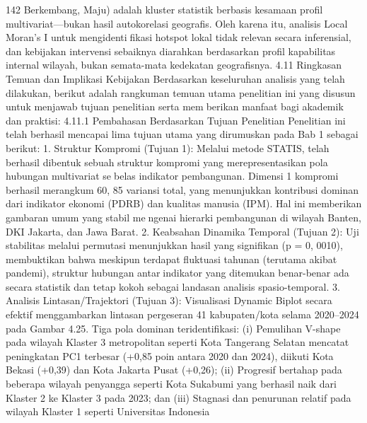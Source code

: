 142
Berkembang, Maju) adalah kluster statistik berbasis kesamaan profil multivariat—bukan
hasil autokorelasi geografis. Oleh karena itu, analisis Local Moran’s I untuk mengidentifikasi hotspot lokal tidak relevan secara inferensial, dan kebijakan intervensi sebaiknya
diarahkan berdasarkan profil kapabilitas internal wilayah, bukan semata-mata kedekatan
geografisnya.
4.11 Ringkasan Temuan dan Implikasi Kebijakan
Berdasarkan keseluruhan analisis yang telah dilakukan, berikut adalah rangkuman
temuan utama penelitian ini yang disusun untuk menjawab tujuan penelitian serta memberikan manfaat bagi akademik dan praktisi:
4.11.1 Pembahasan Berdasarkan Tujuan Penelitian
Penelitian ini telah berhasil mencapai lima tujuan utama yang dirumuskan pada Bab 1
sebagai berikut:
1. Struktur Kompromi (Tujuan 1): Melalui metode STATIS, telah berhasil dibentuk
sebuah struktur kompromi yang merepresentasikan pola hubungan multivariat sebelas indikator pembangunan. Dimensi 1 kompromi berhasil merangkum 60, 85%
variansi total, yang menunjukkan kontribusi dominan dari indikator ekonomi (PDRB)
dan kualitas manusia (IPM). Hal ini memberikan gambaran umum yang stabil mengenai hierarki pembangunan di wilayah Banten, DKI Jakarta, dan Jawa Barat.
2. Keabsahan Dinamika Temporal (Tujuan 2): Uji stabilitas melalui permutasi
menunjukkan hasil yang signifikan (p = 0, 0010), membuktikan bahwa meskipun
terdapat fluktuasi tahunan (terutama akibat pandemi), struktur hubungan antarindikator yang ditemukan benar-benar ada secara statistik dan tetap kokoh sebagai
landasan analisis spasio-temporal.
3. Analisis Lintasan/Trajektori (Tujuan 3): Visualisasi Dynamic Biplot secara efektif
menggambarkan lintasan pergeseran 41 kabupaten/kota selama 2020–2024 pada
Gambar 4.25. Tiga pola dominan teridentifikasi: (i) Pemulihan V-shape pada
wilayah Klaster 3 metropolitan seperti Kota Tangerang Selatan mencatat peningkatan
PC1 terbesar (+0,85 poin antara 2020 dan 2024), diikuti Kota Bekasi (+0,39)
dan Kota Jakarta Pusat (+0,26); (ii) Progresif bertahap pada beberapa wilayah
penyangga seperti Kota Sukabumi yang berhasil naik dari Klaster 2 ke Klaster 3
pada 2023; dan (iii) Stagnasi dan penurunan relatif pada wilayah Klaster 1 seperti
Universitas Indonesia

